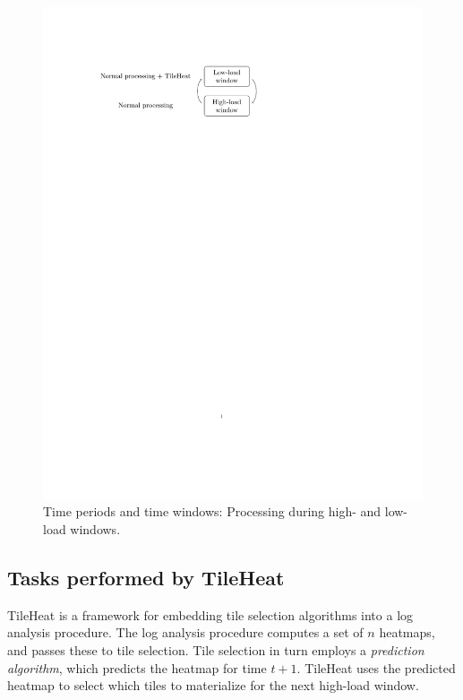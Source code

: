 \documentclass[11pt, oneside]{report}
\begin{document}
\begin{figure}
\centering
\includegraphics[scale=0.8]{figs-tileheat/figoverview}
\caption{Time periods and time windows: Processing during high- and low-load windows.}
\label{fig:high:low}
\end{figure}


\subsection{Tasks performed by TileHeat}
\label{sec:tileheat:tasks}

TileHeat is a framework for embedding tile selection algorithms into a log analysis procedure. The log analysis procedure computes a set of $n$ heatmaps, and passes these to tile selection. Tile selection in turn employs a \emph{prediction algorithm}, which predicts the heatmap for time $t + 1$. TileHeat uses the predicted heatmap to select which tiles to materialize for the next high-load window. 
\end{document}

